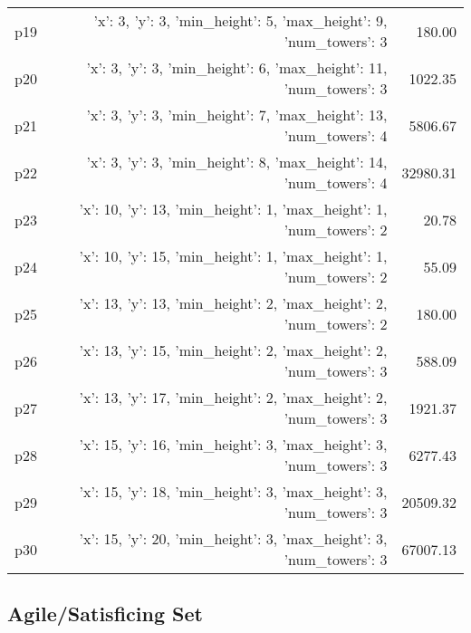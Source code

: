 \documentclass{article}
\begin{document}
\begin{center}
\begin{tabular}{@{}l|r|r@{}}
  p19&{'x': 3, 'y': 3, 'min\_height': 5, 'max\_height': 9, 'num\_towers': 3}&180.00\\
  p20&{'x': 3, 'y': 3, 'min\_height': 6, 'max\_height': 11, 'num\_towers': 3}&1022.35\\
  p21&{'x': 3, 'y': 3, 'min\_height': 7, 'max\_height': 13, 'num\_towers': 4}&5806.67\\
  p22&{'x': 3, 'y': 3, 'min\_height': 8, 'max\_height': 14, 'num\_towers': 4}&32980.31\\
  p23&{'x': 10, 'y': 13, 'min\_height': 1, 'max\_height': 1, 'num\_towers': 2}&20.78\\
  p24&{'x': 10, 'y': 15, 'min\_height': 1, 'max\_height': 1, 'num\_towers': 2}&55.09\\
  p25&{'x': 13, 'y': 13, 'min\_height': 2, 'max\_height': 2, 'num\_towers': 2}&180.00\\
  p26&{'x': 13, 'y': 15, 'min\_height': 2, 'max\_height': 2, 'num\_towers': 3}&588.09\\
  p27&{'x': 13, 'y': 17, 'min\_height': 2, 'max\_height': 2, 'num\_towers': 3}&1921.37\\
  p28&{'x': 15, 'y': 16, 'min\_height': 3, 'max\_height': 3, 'num\_towers': 3}&6277.43\\
  p29&{'x': 15, 'y': 18, 'min\_height': 3, 'max\_height': 3, 'num\_towers': 3}&20509.32\\
  p30&{'x': 15, 'y': 20, 'min\_height': 3, 'max\_height': 3, 'num\_towers': 3}&67007.13
                            \end{tabular}
                            \end{center}
                    

                                \subsection*{Agile/Satisficing Set}
                                
\end{document}
